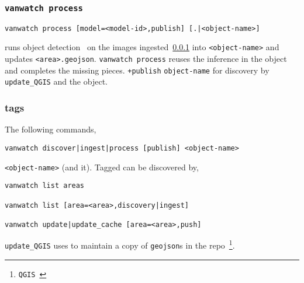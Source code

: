 \subsubsection{\texttt{vanwatch process}}\label{vanwatch_process}

\begin{verbatim}
vanwatch process [model=<model-id>,publish] [.|<object-name>]
\end{verbatim}
%
runs object detection~\cite{ultralytics} on the images ingested~\ref{vanwatch_process} into \texttt{<object-name>} and updates \texttt{<area>.geojson}. \texttt{vanwatch process} reuses the inference in the object and completes the missing pieces. \texttt{+publish}  \texttt{object-name} for discovery by \texttt{update\_QGIS} and  the object.

\subsubsection{tags}\label{vanwatch_tags}

The following commands,

\begin{verbatim}
vanwatch discover|ingest|process [publish] <object-name>
\end{verbatim}
%
 \texttt{<object-name>} (and  it). Tagged  can be discovered by,
%
\begin{verbatim}
vanwatch list areas

vanwatch list [area=<area>,discovery|ingest]

vanwatch update|update_cache [area=<area>,push]
\end{verbatim}
%
\texttt{update\_QGIS} uses  to maintain a copy of \texttt{geojson}s in the repo~\footnote{\texttt{QGIS}~\cite{vanwatch}}.